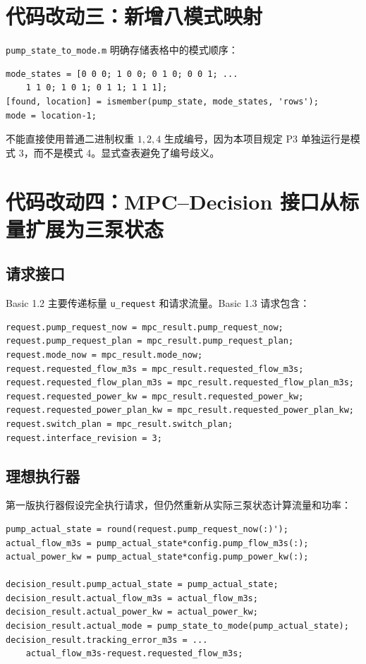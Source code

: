 \documentclass[UTF8,a4paper,11pt]{ctexart}
\newcommand{\code}[1]{\texttt{#1}}
\begin{document}
\section{代码改动三：新增八模式映射}

\code{pump\_state\_to\_mode.m} 明确存储表格中的模式顺序：

\begin{lstlisting}
mode_states = [0 0 0; 1 0 0; 0 1 0; 0 0 1; ...
    1 1 0; 1 0 1; 0 1 1; 1 1 1];
[found, location] = ismember(pump_state, mode_states, 'rows');
mode = location-1;
\end{lstlisting}

不能直接使用普通二进制权重 $1,2,4$ 生成编号，因为本项目规定 P3 单独运行是模式 3，而不是模式 4。显式查表避免了编号歧义。

\section{代码改动四：MPC--Decision 接口从标量扩展为三泵状态}

\subsection{请求接口}

Basic 1.2 主要传递标量 \code{u\_request} 和请求流量。Basic 1.3 请求包含：

\begin{lstlisting}
request.pump_request_now = mpc_result.pump_request_now;
request.pump_request_plan = mpc_result.pump_request_plan;
request.mode_now = mpc_result.mode_now;
request.requested_flow_m3s = mpc_result.requested_flow_m3s;
request.requested_flow_plan_m3s = mpc_result.requested_flow_plan_m3s;
request.requested_power_kw = mpc_result.requested_power_kw;
request.requested_power_plan_kw = mpc_result.requested_power_plan_kw;
request.switch_plan = mpc_result.switch_plan;
request.interface_revision = 3;
\end{lstlisting}

\subsection{理想执行器}

第一版执行器假设完全执行请求，但仍然重新从实际三泵状态计算流量和功率：

\begin{lstlisting}
pump_actual_state = round(request.pump_request_now(:)');
actual_flow_m3s = pump_actual_state*config.pump_flow_m3s(:);
actual_power_kw = pump_actual_state*config.pump_power_kw(:);

decision_result.pump_actual_state = pump_actual_state;
decision_result.actual_flow_m3s = actual_flow_m3s;
decision_result.actual_power_kw = actual_power_kw;
decision_result.actual_mode = pump_state_to_mode(pump_actual_state);
decision_result.tracking_error_m3s = ...
    actual_flow_m3s-request.requested_flow_m3s;
\end{lstlisting}
\end{document}
